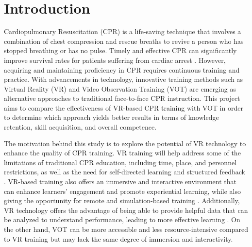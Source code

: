 \documentclass[manuscript]{./Models/acmart}
\begin{document}




\maketitle

\section{Introduction}
 Cardiopulmonary Resuscitation (CPR) is a life-saving technique that involves a combination of chest compression and rescue breaths to revive a person who has stopped breathing or has no pulse. Timely and effective CPR can significantly improve survival rates for patients suffering from cardiac arrest \cite{yang-2020}. However, acquiring and maintaining proficiency in CPR requires continuous training and practice. With advancements in technology, innovative training methods such as Virtual Reality (VR) and Video Observation Training (VOT) are emerging as alternative approaches to traditional face-to-face CPR instruction. This project aims to compare the effectiveness of VR-based CPR training with VOT in order to determine which approach yields better results in terms of knowledge retention, skill acquisition, and overall competence.

The motivation behind this study is to explore the potential of VR technology to enhance the quality of CPR training. VR training will help address some of the limitations of traditional CPR education, including time, place, and personnel restrictions, as well as the need for self-directed learning and structured feedback \cite{almousa-2019, wong-2018, creutzfeldt-2016}. VR-based training also offers an immersive and interactive environment that can enhance learners' engagement and promote experiential learning, while also giving the opportunity for remote and simulation-based training \cite{pottle-2019}. Additionally, VR technology offers the advantage of being able to provide helpful data that can be analyzed to understand performance, leading to more effective learning \cite{yang-2020}. On the other hand, VOT can be more accessible and less resource-intensive compared to VR training but may lack the same degree of immersion and interactivity.
\end{document}
